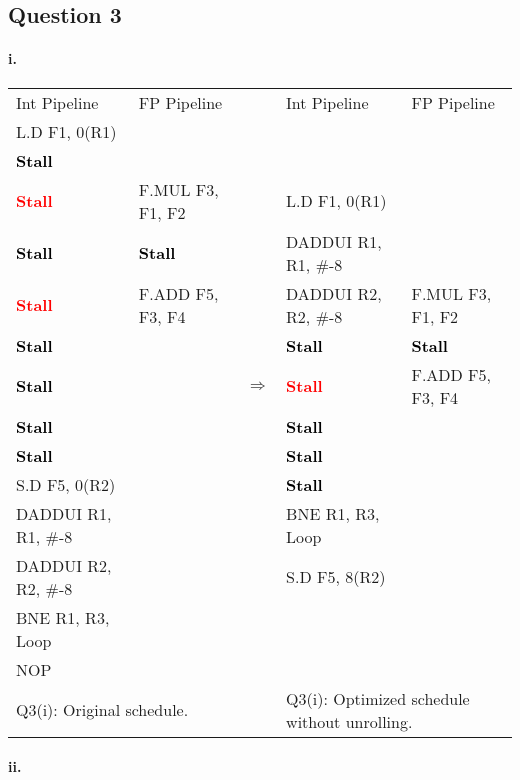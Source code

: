 \documentclass[11pt]{article}
\newcommand{\q}[1]{\subsection*{Question {#1}}}
\renewcommand{\part}[1]{\paragraph*{{#1}.}}
\newcommand{\code}[1]{\textsf{#1}}
\newcommand{\stall}{\textcolor{red}{\textbf{Stall}}}
\newcommand{\cellstall}{\cellcolor{red!25}\textcolor{black}{\textbf{Stall}}}
\begin{document}
\q{3} 
\part{i} 

\begin{table}[h]
\begin{tabular}{llcll}
	 Int Pipeline & FP Pipeline & & Int Pipeline & FP Pipeline \\
	 \code{L.D F1, 0(R1)} &  & & & \\
	 \cellstall &  & & & \\
	 \stall & \code{F.MUL F3, F1, F2} & & \code{L.D F1, 0(R1)} &  \\
	 \cellstall & \cellstall & & \code{DADDUI R1, R1, \#-8} &  \\
	 \stall & \code{F.ADD F5, F3, F4} & & \code{DADDUI R2, R2, \#-8} & \code{F.MUL F3, F1, F2} \\
	 \cellstall &  & & \cellstall & \cellstall \\
	 \cellstall &  & $\Rightarrow$ & \stall & \code{F.ADD F5, F3, F4} \\
	 \cellstall &  & & \cellstall &  \\
	 \cellstall &  & &  \cellstall &   \\
	 \code{S.D F5, 0(R2)} &  & & \cellstall &  \\
	 \code{DADDUI R1, R1, \#-8} &  & &  \code{BNE R1, R3, Loop} &  \\
	 \code{DADDUI R2, R2, \#-8} &  & &  \code{S.D F5, 8(R2)} &  \\
	 \code{BNE R1, R3, Loop}  &  & &  &  \\
	 \code{NOP} &  & & & \\
	 \multicolumn{2}{l}{Q3(i): Original schedule.} & & \multicolumn{2}{l}{Q3(i): Optimized schedule without unrolling.} 
\end{tabular}
\label{tbl:q3-p1}
\end{table}


\part{ii} 
\end{document}
